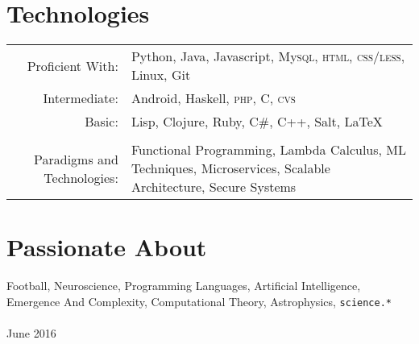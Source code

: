 \documentclass[a4paper,11pt]{article}
\begin{document}
\section{Technologies}
\begin{tabular}{rp{8cm}}
 Proficient With:& Python, Java, Javascript, My\textsc{sql}, \textsc{html}, \textsc{css/less}, Linux, Git\\
Intermediate:& Android, Haskell, \textsc{php}, \textsc{C}, \textsc{cvs}\\
Basic: & Lisp, Clojure, Ruby, \textsc{C\#}, \textsc{C++}, Salt,     {\LaTeX}\\
\\
Paradigms and Technologies: & Functional Programming, Lambda Calculus, ML Techniques, Microservices, Scalable Architecture, Secure Systems
\end{tabular}

\section{Passionate About}
Football, Neuroscience, Programming Languages, Artificial Intelligence, Emergence And Complexity, Computational Theory, Astrophysics, \texttt{science.*} \\

\\[40pt]
\footnotesize{June 2016}
\end{document}

